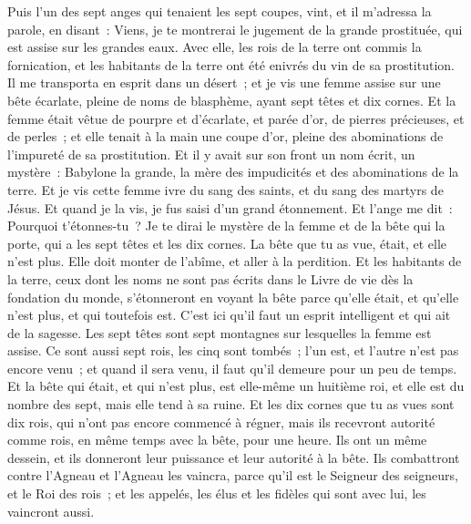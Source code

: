 \begin{multicols}{2}
\VerseOne{}Puis l'un des sept anges qui tenaient les sept coupes, vint, et il m'adressa la parole, en disant~: Viens, je te montrerai le jugement de la grande prostituée, qui est assise sur les grandes eaux.
Avec elle, les rois de la terre ont commis la fornication, et les habitants de la terre ont été enivrés du vin de sa prostitution.
Il me transporta en esprit dans un désert~; et je vis une femme assise sur une bête écarlate, pleine de noms de blasphème, ayant sept têtes et dix cornes.
Et la femme était vêtue de pourpre et d'écarlate, et parée d'or, de pierres précieuses, et de perles~; et elle tenait à la main une coupe d'or, pleine des abominations de l'impureté de sa prostitution.
Et il y avait sur son front un nom écrit, un mystère~: Babylone la grande, la mère des impudicités et des abominations de la terre.
Et je vis cette femme ivre du sang des saints, et du sang des martyrs de Jésus. Et quand je la vis, je fus saisi d'un grand étonnement.
Et l'ange me dit~: Pourquoi t'étonnes-tu~? Je te dirai le mystère de la femme et de la bête qui la porte, qui a les sept têtes et les dix cornes.
La bête que tu as vue, était, et elle n'est plus. Elle doit monter de l'abîme, et aller à la perdition. Et les habitants de la terre, ceux dont les noms ne sont pas écrits dans le Livre de vie dès la fondation du monde, s'étonneront en voyant la bête parce qu'elle était, et qu'elle n'est plus, et qui toutefois est.
C'est ici qu'il faut un esprit intelligent et qui ait de la sagesse. Les sept têtes sont sept montagnes sur lesquelles la femme est assise.
Ce sont aussi sept rois, les cinq sont tombés~; l'un est, et l'autre n'est pas encore venu~; et quand il sera venu, il faut qu'il demeure pour un peu de temps.
Et la bête qui était, et qui n'est plus, est elle-même un huitième roi, et elle est du nombre des sept, mais elle tend à sa ruine.
Et les dix cornes que tu as vues sont dix rois, qui n'ont pas encore commencé à régner, mais ils recevront autorité comme rois, en même temps avec la bête, pour une heure.
Ils ont un même dessein, et ils donneront leur puissance et leur autorité à la bête.
Ils combattront contre l'Agneau et l'Agneau les vaincra, parce qu'il est le Seigneur des seigneurs, et le Roi des rois~; et les appelés, les élus et les fidèles qui sont avec lui, les vaincront aussi.

\end{multicols}
